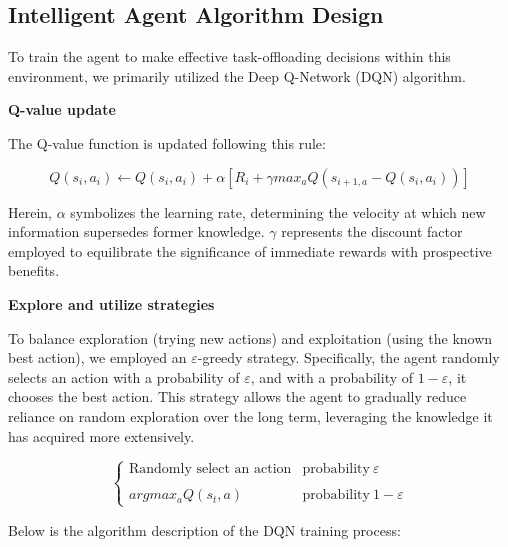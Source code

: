\documentclass[preprint,12pt]{elsarticle}
\begin{document}
\subsection{Intelligent Agent Algorithm Design}
To train the agent to make effective task-offloading decisions within this environment, we primarily utilized the Deep Q-Network (DQN) algorithm.

\textbf{Q-value update}

The Q-value function is updated following this rule:

\begin{equation}
    Q(s_i,a_i)\gets Q(s_i,a_i)+\alpha [R_i+\gamma max_aQ(s_{i+1,a}-Q(s_i,a_i))]
\end{equation}

Herein, \(\alpha\) symbolizes the learning rate, determining the velocity at which new information supersedes former knowledge. \(\gamma\) represents the discount factor employed to equilibrate the significance of immediate rewards with prospective benefits.

\textbf{Explore and utilize strategies}

To balance exploration (trying new actions) and exploitation (using the known best action), we employed an \(\varepsilon\)-greedy strategy. Specifically, the agent randomly selects an action with a probability of \(\varepsilon\), and with a probability of \(1-\varepsilon\), it chooses the best action. This strategy allows the agent to gradually reduce reliance on random exploration over the long term, leveraging the knowledge it has acquired more extensively.

\begin{equation}
    \left\{
        \begin{array}{ll}
            \text{Randomly select an action} & \text{probability}\ \varepsilon \\
            \\argmax_a Q(s_t, a) & \text{probability}\ 1 - \varepsilon
        \end{array}
    \right.
\end{equation}


Below is the algorithm description of the DQN training process:
\end{document}
